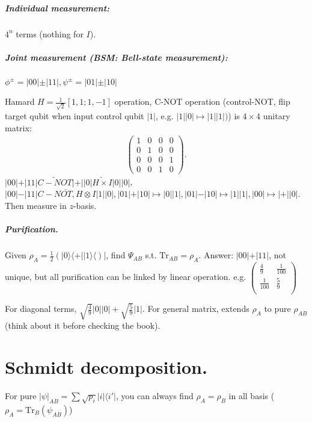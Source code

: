 \documentclass{article}
\newcommand{\Tr}{\mathrm{Tr}}
\newcommand{\bra}[1]{\langle #1\vert}
\newcommand{\ket}[1]{\vert #1\vert}
\newcommand{\ketbra}[2]{\vert #1\rangle \langle #2\vert}
\begin{document}
\begin{spacing}{1.2}
\subparagraph{Individual measurement:} $4^n$ terms (nothing for $I$).
\subparagraph{Joint measurement (BSM: Bell-state measurement):} $\phi^{\pm} = \ket{00}\pm\ket{11}, \psi^{\pm} = \ket{01}\pm\ket{10}$

Hamard $H = \frac{1}{\sqrt2}[1, 1; 1, -1]$ operation, C-NOT operation (control-NOT, flip target qubit when input control qubit $\ket{1}$, e.g. $\ket{1}\ket{0}\mapsto\ket{1}\ket{1})$) is $4\times 4$ unitary matrix:
\begin{gather*}
\left(\begin{array}{cccc}
1&0&0&0\\
0&1&0&0\\
0&0&0&1\\
0&0&1&0
\end{array}\right).
\end{gather*}
$\ket{00}+\ket{11}\underrightarrow{C-NOT}\ket{+}\ket{0} \underrightarrow{H\times I} \ket{0}\ket{0}$, $\ket{00}-\ket{11}\underrightarrow{C-NOT, H\otimes I} \ket{1}\ket{0}, \ket{01}+\ket{10}\mapsto \ket{0}\ket{1}, \ket{01}-\ket{10}\mapsto \ket{1}\ket{1}, \ket{00}\mapsto\ket{+}\ket{0}$. Then measure in $z$-basis.

\subparagraph{Purification.} Given $\rho_A = \frac{1}{2}(\ketbra{0}+\ketbra{1})$, find $\Psi_{AB}$ s.t. $\Tr_{AB} = \rho_A$. Answer: $\ket{00}+\ket{11}$, not unique, but all purification can be linked by linear operation. e.g.
$ \left(\begin{array}{cc}
\frac49 &\frac{1}{100}\\
\frac{1}{100}&\frac59\\
\end{array}\right)$

For diagonal terms, $\sqrt{\frac49}\ket{0}\ket{0}+\sqrt{\frac59}\ket{1}$. For general matrix, extends $\rho_A$ to pure $\rho_{AB}$ (think about it before checking the book).

\section{Schmidt decomposition.}
For pure $\ket{\psi}_{AB} = \sum\sqrt{p_i}\ket{i}\bra{i'}$, you can always find $\rho_A = \rho_B$ in all basis ($\rho_A = \Tr_B(\psi_{AB})$)

\end{spacing}
\end{document}
